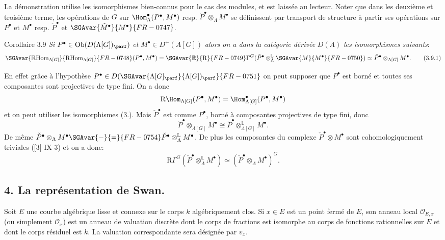 La démonstration utilise les isomorphismes bien-connus pour le cas des modules, et est laissée au lecteur. Noter que dans les deuxième et troisième terme, les opérations de $G$ sur $\Hom_\Lambda^\bullet(P^\bullet,M^\bullet)$ resp. $\check P^\bullet\otimes_\Lambda M^\bullet$ se définissent par transport de structure à partir  ses opérations sur $P^\bullet$ et $M^\bullet$ resp. $\check P^\bullet$ et $\SGAvar{\check M^\bullet}{M^\bullet}{FR-0747}$.

\begin{statement}{Corollaire 3.9}
\emph{Si} $P^\bullet\in \operatorname{Ob}(D(\Lambda[G])_{\parf})$ \emph{et} $M^\bullet\in D^+(A[G])$ \emph{alors on a dans la catégorie dérivée} $D(A)$ \emph{les isomorphismes suivants}:
\[
\SGAvar{\mathbb{R}\mathrm{Hom}_{\Lambda[G]}}{\mathrm{RHom}_{\Lambda[G]}}{FR-0748}(P^\bullet,M^\bullet)
=\SGAvar{\mathbb{R}}{\mathrm{R}}{FR-0749}\Gamma^G(\check P^\bullet\otimes_\Lambda^{\mathbb{L}}\SGAvar{M}{M^\bullet}{FR-0750})
\simeq \check P^\bullet\otimes_{\Lambda[G]}M^\bullet.
\tag{3.9.1}
\]
\end{statement}

En effet grâce à l'hypothèse $P^\bullet\in D(\SGAvar{\Lambda[G]_{\parf}}{\Lambda[G])_{\parf}}{FR-0751}$ on peut supposer que $P^\bullet$ est borné et toutes ses composantes sont projectives de type 
fini. On a donc
\[
\mathrm{R}\Hom_{\Lambda[G]}(P^\bullet,M^\bullet)=\Hom_{\Lambda[G]}^\bullet(P^\bullet,M^\bullet)
\]
et on
peut utiliser les isomorphismes (3.). Mais $\check P^\bullet$ est comme $P^\bullet$, borné à composantes projectives de type fini, donc
\[
\check P^\bullet\otimes_{\Lambda[G]}M^\bullet\cong \check P^\bullet\otimes_{\Lambda[G]}^{\mathbb{L}}M^\bullet.
\]
De même $\check P^\bullet\otimes_\Lambda M^\bullet\SGAvar{-}{=}{FR-0754}\check P^\bullet\otimes_\Lambda^{\mathbb{L}}M^\bullet$. De plus les composantes du complexe $\check P^\bullet\otimes M^\bullet$ sont cohomologiquement triviales ([3] IX 3) et on a donc:
\[
\mathrm{R}\Gamma^G(\check P^\bullet\otimes_\Lambda^{\mathbb{L}}M^\bullet)\simeq (\check P^\bullet\otimes_\Lambda M^\bullet)^G.
\]

\subsection*{4. La représentation de Swan.}

Soit $E$ une courbe algébrique lisse et connexe sur le corps $k$ algébriquement clos. Si $x\in E$ est un point fermé de $E$, son anneau local $\mathcal{O}_{E,x}$ (ou simplement $\mathcal{O}_x$) est un anneau de valuation discrète dont le corps de fractions est isomorphe au corps de fonctions rationnelles sur $E$ et dont le corps résiduel est $k$. La valuation correspondante sera désignée par $v_x$.

